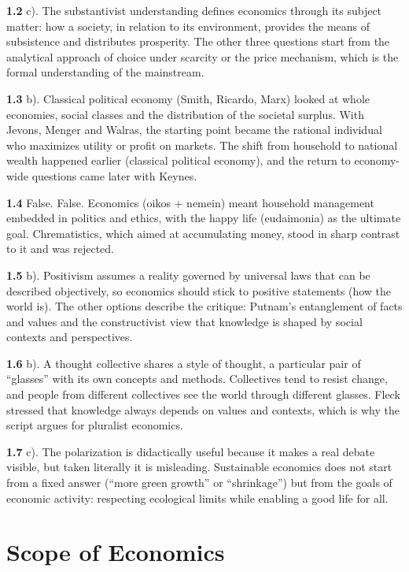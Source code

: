 \documentclass[
  british,
  a4paper,
  DIV=11,
  numbers=noendperiod,
  oneside,
  openany]{scrreprt}
\begin{document}
\textbf{1.2} c). The substantivist understanding defines economics
through its subject matter: how a society, in relation to its
environment, provides the means of subsistence and distributes
prosperity. The other three questions start from the analytical approach
of choice under scarcity or the price mechanism, which is the formal
understanding of the mainstream.

\textbf{1.3} b). Classical political economy (Smith, Ricardo, Marx)
looked at whole economies, social classes and the distribution of the
societal surplus. With Jevons, Menger and Walras, the starting point
became the rational individual who maximizes utility or profit on
markets. The shift from household to national wealth happened earlier
(classical political economy), and the return to economy-wide questions
came later with Keynes.

\textbf{1.4} False. False. Economics (oikos + nemein) meant household
management embedded in politics and ethics, with the happy life
(eudaimonia) as the ultimate goal. Chrematistics, which aimed at
accumulating money, stood in sharp contrast to it and was rejected.

\textbf{1.5} b). Positivism assumes a reality governed by universal laws
that can be described objectively, so economics should stick to positive
statements (how the world is). The other options describe the critique:
Putnam's entanglement of facts and values and the constructivist view
that knowledge is shaped by social contexts and perspectives.

\textbf{1.6} b). A thought collective shares a style of thought, a
particular pair of ``glasses'' with its own concepts and methods.
Collectives tend to resist change, and people from different collectives
see the world through different glasses. Fleck stressed that knowledge
always depends on values and contexts, which is why the script argues
for pluralist economics.

\textbf{1.7} c). The polarization is didactically useful because it
makes a real debate visible, but taken literally it is misleading.
Sustainable economics does not start from a fixed answer (``more green
growth'' or ``shrinkage'') but from the goals of economic activity:
respecting ecological limits while enabling a good life for all.

\chapter{Scope of Economics}\label{scope-of-economics}
\end{document}
